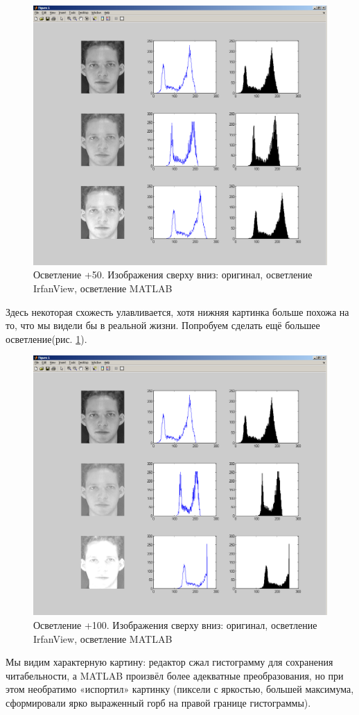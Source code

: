 \documentclass[a4paper,12pt,titlpage]{posobie}
\begin{document}
\begin{figure}[h]
   \includegraphics[width=\textwidth]{report/pic_2.png}
   \caption{Осветление +50. Изображения сверху вниз: оригинал, осветление IrfanView, осветление MATLAB}\label{fig:faces_irfan_1}
\end{figure}
Здесь некоторая схожесть улавливается, хотя нижняя картинка больше похожа на то, что мы видели бы в 
реальной жизни. Попробуем сделать ещё большее осветление(рис. \ref{fig:faces_irfan_1}).
\begin{figure}[h]
   \includegraphics[width=\textwidth]{report/pic_3.png}
   \caption{Осветление +100. Изображения сверху вниз: оригинал, осветление IrfanView, осветление MATLAB}\label{fig:faces_irfan_2}
\end{figure}
Мы видим характерную картину: редактор сжал гистограмму для сохранения читабельности, а MATLAB произвёл более адекватные преобразования, но при этом необратимо «испортил» картинку (пиксели с яркостью, большей максимума, сформировали ярко выраженный горб на правой границе гистограммы). 
\end{document}
